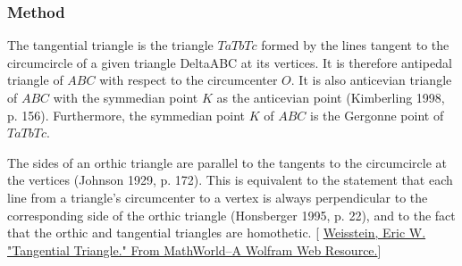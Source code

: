 

\subsubsection{Method } %
\label{ssub:method_imeth_triangle_tangential}

The tangential triangle is the triangle $TaTbTc$ formed by the lines tangent to the circumcircle of a given triangle DeltaABC at its vertices. It is therefore antipedal triangle of $ABC$ with respect to the circumcenter $O$. It is also anticevian triangle of $ABC$ with the symmedian point $K$ as the anticevian point (Kimberling 1998, p. 156). Furthermore, the symmedian point $K$ of $ABC$ is the Gergonne point of $TaTbTc$.

The sides of an orthic triangle are parallel to the tangents to the circumcircle at the vertices (Johnson 1929, p. 172). This is equivalent to the statement that each line from a triangle's circumcenter to a vertex is always perpendicular to the corresponding side of the orthic triangle (Honsberger 1995, p. 22), and to the fact that the orthic and tangential triangles are homothetic.
[ \href{https://mathworld.wolfram.com/TangentialTriangle.html}{Weisstein, Eric W. "Tangential Triangle." From MathWorld--A Wolfram Web Resource.}]

